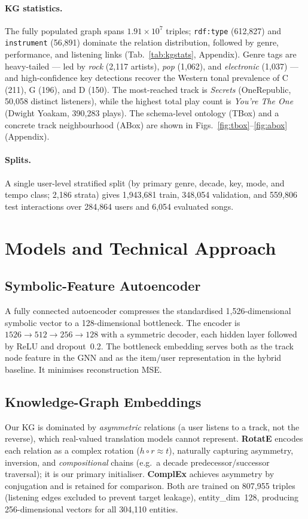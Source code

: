 \documentclass[10pt,twocolumn,letterpaper]{article}
\begin{document}
\paragraph{KG statistics.} The fully populated graph spans
$1.91\!\times\!10^{7}$ triples; \texttt{rdf:type} (612{,}827) and
\texttt{instrument} (56{,}891) dominate the relation distribution, followed by
genre, performance, and listening links (Tab.~\ref{tab:kgstats}, Appendix). Genre
tags are heavy-tailed --- led by \emph{rock} (2{,}117 artists), \emph{pop}
(1{,}062), and \emph{electronic} (1{,}037) --- and high-confidence key detections
recover the Western tonal prevalence of C (211), G (196), and D (150). The
most-reached track is \emph{Secrets} (OneRepublic, 50{,}058 distinct listeners),
while the highest total play count is \emph{You're The One} (Dwight Yoakam,
390{,}283 plays). The schema-level ontology (TBox) and a concrete track
neighbourhood (ABox) are shown in Figs.~\ref{fig:tbox}--\ref{fig:abox} (Appendix).

\paragraph{Splits.} A single user-level stratified split (by primary genre,
decade, key, mode, and tempo class; 2{,}186 strata) gives 1{,}943{,}681 train,
348{,}054 validation, and 559{,}806 test interactions over 284{,}864 users and
6{,}054 evaluated songs.

\section{Models and Technical Approach}
\label{sec:models}

\subsection{Symbolic-Feature Autoencoder}
A fully connected autoencoder compresses the standardised 1{,}526-dimensional
symbolic vector to a 128-dimensional bottleneck. The encoder is
$1526\!\to\!512\!\to\!256\!\to\!128$ with a symmetric decoder, each hidden layer
followed by ReLU and dropout~0.2. The bottleneck embedding serves both as the
track node feature in the GNN and as the item/user representation in the hybrid
baseline. It minimises reconstruction MSE.

\subsection{Knowledge-Graph Embeddings}
Our KG is dominated by \emph{asymmetric} relations (a user listens to a track, not
the reverse), which real-valued translation models cannot represent. \textbf{RotatE}
encodes each relation as a complex rotation ($h\circ r\approx t$), naturally
capturing asymmetry, inversion, and \emph{compositional} chains (e.g.\ a decade
predecessor/successor traversal); it is our primary initialiser. \textbf{ComplEx}
achieves asymmetry by conjugation and is retained for comparison. Both are trained
on 807{,}955 triples (listening edges excluded to prevent target leakage),
entity\_dim~128, producing 256-dimensional vectors for all 304{,}110 entities.
\end{document}
